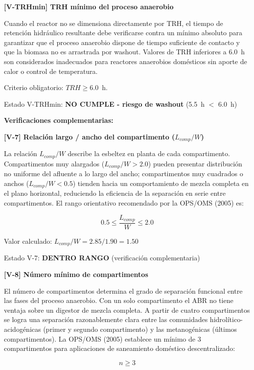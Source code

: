 \documentclass[12pt,a4paper]{article}
\begin{document}
\textbf{[V-TRHmin] TRH mínimo del proceso anaerobio}

Cuando el reactor no se dimensiona directamente por TRH, el tiempo de retención hidráulico resultante debe verificarse contra un mínimo absoluto para garantizar que el proceso anaerobio dispone de tiempo suficiente de contacto y que la biomasa no es arrastrada por washout. Valores de TRH inferiores a 6.0~h son considerados inadecuados para reactores anaerobios domésticos sin aporte de calor o control de temperatura.

Criterio obligatorio: $TRH \geq 6.0$~h.

Estado V-TRHmin: \textbf{NO CUMPLE - riesgo de washout} (5.5~h $<$ 6.0~h)

\textbf{Verificaciones complementarias:}

\textbf{[V-7] Relación largo / ancho del compartimento ($L_{comp} / W$)}

La relación $L_{comp} / W$ describe la esbeltez en planta de cada compartimento. Compartimentos muy alargados ($L_{comp} / W > 2.0$) pueden presentar distribución no uniforme del afluente a lo largo del ancho; compartimentos muy cuadrados o anchos ($L_{comp} / W < 0.5$) tienden hacia un comportamiento de mezcla completa en el plano horizontal, reduciendo la eficiencia de la separación en serie entre compartimentos. El rango orientativo recomendado por la OPS/OMS (2005) es:

\begin{equation}
0.5 \leq \frac{L_{comp}}{W} \leq 2.0
\end{equation}

Valor calculado: $L_{comp} / W = 2.85 / 1.90 = 1.50$

Estado V-7: \textbf{DENTRO RANGO} (verificación complementaria)

\textbf{[V-8] Número mínimo de compartimentos}

El número de compartimentos determina el grado de separación funcional entre las fases del proceso anaerobio. Con un solo compartimento el ABR no tiene ventaja sobre un digestor de mezcla completa. A partir de cuatro compartimentos se logra una separación razonablemente clara entre las comunidades hidrolítico-acidogénicas (primer y segundo compartimento) y las metanogénicas (últimos compartimentos). La OPS/OMS (2005) establece un mínimo de 3 compartimentos para aplicaciones de saneamiento doméstico descentralizado:

\begin{equation}
n \geq 3
\end{equation}
\end{document}
